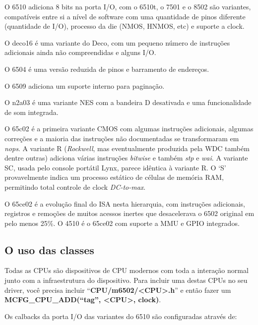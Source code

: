 \documentclass[letterpaper,10pt,brazil]{sphinxmanual}
\begin{document}
O 6510 adiciona 8 bits na porta I/O, com o 6510t, o 7501 e o 8502 são
variantes, compatíveis entre si a nível de software com uma quantidade
de pinos diferente (quantidade de I/O), processo da die (NMOS, HNMOS,
etc) e suporte a clock.

O deco16 é uma variante do Deco, com um pequeno número de instruções
adicionais ainda não compreendidas e alguns I/O.

O 6504 é uma versão reduzida de pinos e barramento de endereços.

O 6509 adiciona um suporte interno para paginação.

O n2a03 é uma variante NES com a bandeira D desativada e uma
funcionalidade de som integrada.

O 65c02 é a primeira variante CMOS com algumas instruções adicionais,
algumas correções e a maioria das instruções não documentadas se
transformaram em \emph{nops}. A variante R (\emph{Rockwell}, mas eventualmente
produzida pela WDC também dentre outras) adiciona várias instruções
\emph{bitwise} e também \emph{stp} e \emph{wai}. A variante SC, usada pelo console
portátil Lynx, parece idêntica à variante R. O `S' provavelmente indica
um processo estático de células de memória RAM, permitindo total
controle de clock \emph{DC-to-max}.

O 65ce02 é a evolução final do ISA nesta hierarquia, com instruções
adicionais, registros e remoções de muitos acessos inertes que
desacelerava o 6502 original em pelo menos 25\%. O 4510 é o 65ce02 com
suporte a MMU e GPIO integrados.


\subsection{O uso das classes}
\label{techspecs/m6502:o-uso-das-classes}
Todas as CPUs são dispositivos de CPU modernos com toda a interação
normal junto com a infraestrutura do dispositivo. Para incluir uma
destas CPUs no seu driver, você precisa incluir ``\textbf{CPU/m6502/\textless{}CPU\textgreater{}.h}''
e então fazer um \textbf{MCFG\_CPU\_ADD(``tag'', \textless{}CPU\textgreater{}, clock)}.

Os calbacks da porta I/O das variantes do 6510 são configuradas através
de:
\begin{quote}

\end{quote}
\end{document}
